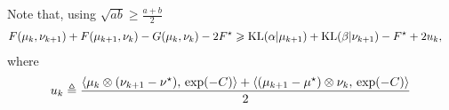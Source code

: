 \documentclass[a4paper, 10pt]{article}
\begin{document}
Note that, using $\sqrt{ab} \geq \frac{a + b}{2}$ 
\begin{align}
    F(\mu_k,\nu_{k+1}) + F(\mu_{k+1},\nu_k) - G(\mu_k, \nu_k) - 2 F^\star
    &\geqslant \text{KL}(\alpha|\mu_{k+1}) + \text{KL}(\beta|\nu_{k+1}) - F^\star
        + 2 u_k,
\end{align}
where 
\begin{align}
    u_k &\triangleq
    \frac{
        \langle \mu_k \otimes (\nu_{k+1} - \nu^\star),\,\exp(-C)\rangle
        + \langle (\mu_{k+1} - \mu^\star)\otimes \nu_k,\,\exp(-C)\rangle
        }{2} \\
\end{align}
\end{document}
